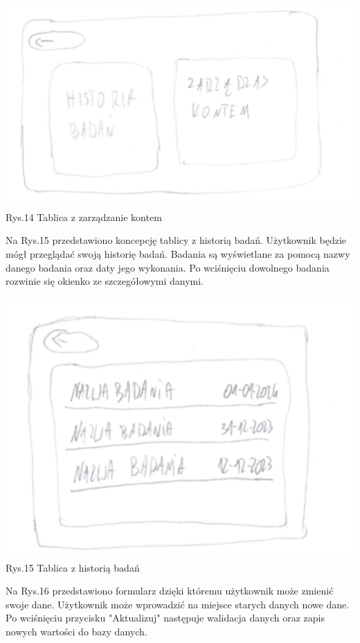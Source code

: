 \documentclass[12pt, letterpaper]{article}
\begin{document}
		\begin{center}
			\includegraphics[scale=0.5]{GUI_zarzadzanie_kontem}\\
			\caption{Rys.14 Tablica z zarządzanie kontem}
		\end{center}
		
		Na Rys.15 przedstawiono koncepcję tablicy z historią badań. Użytkownik będzie mógł przeglądać  swoją historię badań. Badania są wyświetlane za pomocą nazwy danego badania oraz daty jego wykonania. Po wciśnięciu dowolnego badania rozwinie się okienko ze szczegółowymi danymi.
		
		\begin{center}
			\includegraphics[scale=0.6]{GUI_historia_badan}\\
			\caption{Rys.15 Tablica z historią badań}
		\end{center}
		
		Na Rys.16 przedstawiono formularz dzięki któremu użytkownik może zmienić swoje dane. Użytkownik może wprowadzić na miejsce starych danych nowe dane. Po wciśnięciu przycisku "Aktualizuj" następuje walidacja danych oraz zapis nowych wartości do bazy danych.
		
\end{document}
